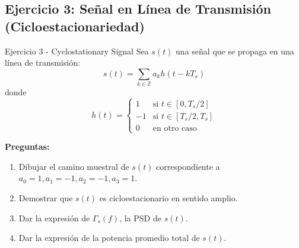 \documentclass[10pt,a4paper]{article}
\begin{document}
\newpage
\subsection{Ejercicio 3: Señal en Línea de Transmisión (Cicloestacionariedad)}

\begin{ejercicio}{Ejercicio 3 - Cyclostationary Signal}
Sea $s(t)$ una señal que se propaga en una línea de transmisión:
\[
s(t) = \sum_{k \in \mathbb{Z}} a_k h(t - kT_s)
\]
donde
\[
h(t) = \begin{cases}
1 & \text{si } t \in [0, T_s/2]\\
-1 & \text{si } t \in [T_s/2, T_s]\\
0 & \text{en otro caso}
\end{cases}
\]

\textbf{Preguntas:}
\begin{enumerate}
\item Dibujar el camino muestral de $s(t)$ correspondiente a $a_0 = 1, a_1 = -1, a_2 = -1, a_3 = 1$.
\item Demostrar que $s(t)$ es cicloestacionario en sentido amplio.
\item Dar la expresión de $\Gamma_s(f)$, la PSD de $s(t)$.
\item Dar la expresión de la potencia promedio total de $s(t)$.
\end{enumerate}
\end{ejercicio}
\end{document}
